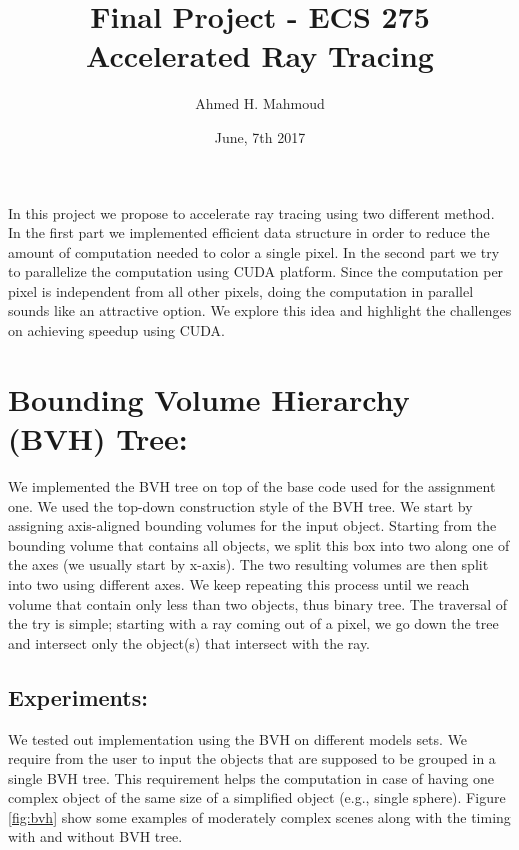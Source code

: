 \documentclass[12pt] {article}
\begin{document}
\title{Final Project - ECS 275\\
\vspace{2mm}
Accelerated Ray Tracing}

\author{Ahmed H. Mahmoud}
\date{June, 7th 2017} 
\maketitle

In this project we propose to accelerate ray tracing using two different method. In the first part we implemented efficient data structure in order to reduce the amount of computation needed to color a single pixel. In the second part we try to parallelize the computation using CUDA platform. Since the computation per pixel is independent from all other pixels, doing the computation in parallel sounds like an attractive option. We explore this idea and highlight the challenges on achieving speedup using CUDA.  

\section{Bounding Volume Hierarchy (BVH) Tree:}
We implemented the BVH tree on top of the base code used for the assignment one. We used the top-down construction style of the BVH tree. We start by assigning axis-aligned bounding volumes for the input object. Starting from the bounding volume that contains all objects, we split this box into two along one of the axes (we usually start by x-axis). The two resulting volumes are then split into two using different axes. We keep repeating this process until we reach volume that contain only less than two objects, thus binary tree. The traversal of the try is simple; starting with a ray coming out of a pixel, we go down the tree and intersect only the object(s) that intersect with the ray. 

\subsection{Experiments:}
We tested out implementation using the BVH on different models sets. We require from the user to input the objects that are supposed to be grouped in a single BVH tree. This requirement helps the computation in case of having one complex object of the same size of a simplified object (e.g., single sphere). Figure \ref{fig:bvh} show some examples of moderately complex scenes along with the timing with and without BVH tree. 
\end{document}

